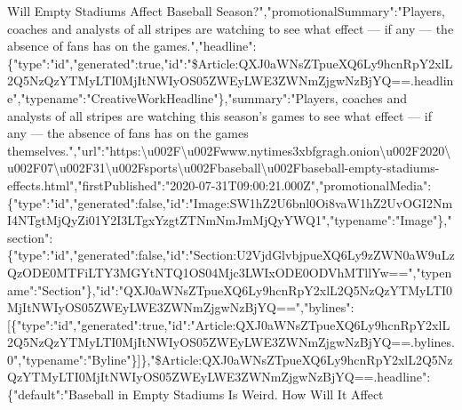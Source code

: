 Will Empty Stadiums Affect Baseball
Season?","promotionalSummary":"Players, coaches and analysts of all
stripes are watching to see what effect --- if any --- the absence of
fans has on the
games.","headline":\{"type":"id","generated":true,"id":"\$Article:QXJ0aWNsZTpueXQ6Ly9hcnRpY2xlL2Q5NzQzYTMyLTI0MjItNWIyOS05ZWEyLWE3ZWNmZjgwNzBjYQ==.headline","typename":"CreativeWorkHeadline"\},"summary":"Players,
coaches and analysts of all stripes are watching this season's games to
see what effect --- if any --- the absence of fans has on the games
themselves.","url":"https:\textbackslash{}u002F\textbackslash{}u002Fwww.nytimes3xbfgragh.onion\textbackslash{}u002F2020\textbackslash{}u002F07\textbackslash{}u002F31\textbackslash{}u002Fsports\textbackslash{}u002Fbaseball\textbackslash{}u002Fbaseball-empty-stadiums-effects.html","firstPublished":"2020-07-31T09:00:21.000Z","promotionalMedia":\{"type":"id","generated":false,"id":"Image:SW1hZ2U6bnl0Oi8vaW1hZ2UvOGI2NmI4NTgtMjQyZi01Y2I3LTgxYzgtZTNmNmJmMjQyYWQ1","typename":"Image"\},"section":\{"type":"id","generated":false,"id":"Section:U2VjdGlvbjpueXQ6Ly9zZWN0aW9uLzQzODE0MTFiLTY3MGYtNTQ1OS04Mjc3LWIxODE0ODVhMTllYw==","typename":"Section"\},"id":"QXJ0aWNsZTpueXQ6Ly9hcnRpY2xlL2Q5NzQzYTMyLTI0MjItNWIyOS05ZWEyLWE3ZWNmZjgwNzBjYQ==","bylines":{[}\{"type":"id","generated":true,"id":"Article:QXJ0aWNsZTpueXQ6Ly9hcnRpY2xlL2Q5NzQzYTMyLTI0MjItNWIyOS05ZWEyLWE3ZWNmZjgwNzBjYQ==.bylines.0","typename":"Byline"\}{]}\},"\$Article:QXJ0aWNsZTpueXQ6Ly9hcnRpY2xlL2Q5NzQzYTMyLTI0MjItNWIyOS05ZWEyLWE3ZWNmZjgwNzBjYQ==.headline":\{"default":"Baseball
in Empty Stadiums Is Weird. How Will It Affect
